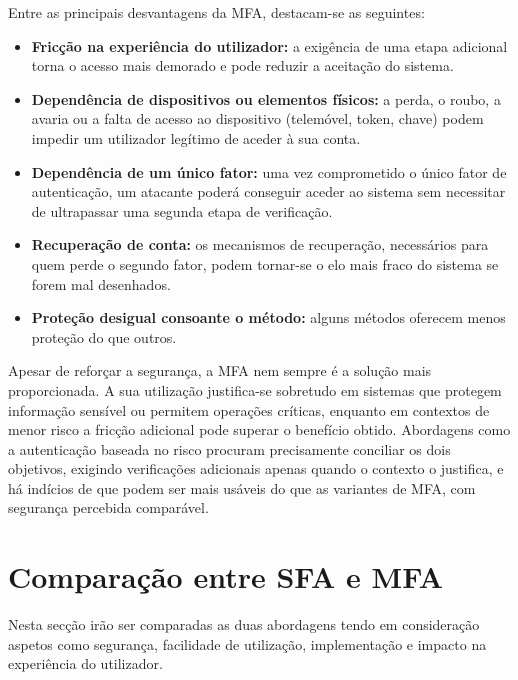 \hspace{1cm} Entre as principais desvantagens da MFA, destacam-se as seguintes:

\begin{itemize}[leftmargin=2cm]
    \item \textbf{Fricção na experiência do utilizador:} a exigência de uma etapa adicional torna o acesso mais demorado e pode reduzir a aceitação do sistema.

    \item \textbf{Dependência de dispositivos ou elementos físicos:} a perda, o roubo, a avaria ou a falta de acesso ao dispositivo (telemóvel, token, chave) podem impedir um utilizador legítimo de aceder à sua conta.

    \item \textbf{Dependência de um único fator:} uma vez comprometido o único fator de autenticação, um atacante poderá conseguir aceder ao sistema sem necessitar de ultrapassar uma segunda etapa de verificação.

    \item \textbf{Recuperação de conta:} os mecanismos de recuperação, necessários para quem perde o segundo fator, podem tornar-se o elo mais fraco do sistema se forem mal desenhados.

    \item \textbf{Proteção desigual consoante o método:} alguns métodos oferecem menos proteção do que outros.
\end{itemize}

\hspace{1cm} Apesar de reforçar a segurança, a MFA nem sempre é a solução mais proporcionada. A sua utilização justifica-se sobretudo em sistemas que protegem informação sensível ou permitem operações críticas, enquanto em contextos de menor risco a fricção adicional pode superar o benefício obtido. Abordagens como a autenticação baseada no risco procuram precisamente conciliar os dois objetivos, exigindo verificações adicionais apenas quando o contexto o justifica, e há indícios de que podem ser mais usáveis do que as variantes de MFA, com segurança percebida comparável.



\section{Comparação entre SFA e MFA}

\hspace{1cm} Nesta secção irão ser comparadas as duas abordagens tendo em consideração aspetos como segurança, facilidade de utilização, implementação e impacto na experiência do utilizador.

